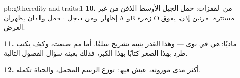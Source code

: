 \begin{solution}{pb:g9:heredity-and-traits:1}
\textbf{10.} من القفزات: حمل الجيل الأوسط الذقن من غير
إظهار. ومن سجل : حمل والدان يظهران A وB زمرة O
مستترة. مرتين إذن،  يفوق العرض.

\textbf{11.} ماديًا: هي في نوى  --- وهذا القدر
يثبته تشريح  سلفًا. أما مم صنعت، وكيف يكتب طرد
بهذا الصغر كتابًا بهذا الكبر، فذلك بعينه سؤال الفصول
التالية.

\textbf{12.} أكثر  مدى موروثة، عيش فيها: 
توزع الرسم المجمل، والحياة تكمله.
\end{solution}
